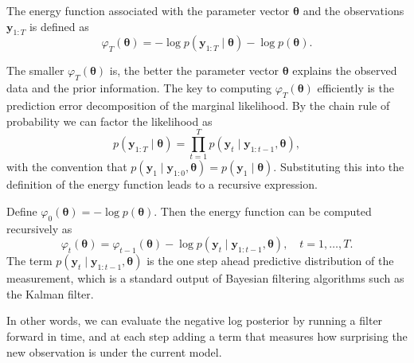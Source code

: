 \begin{definition}
    The energy function associated with the parameter vector $\boldsymbol{\theta}$ and the observations $\mathbf{y}_{1:T}$ is defined as 
    \begin{equation}
        \varphi_T(\boldsymbol{\theta}) = -\log p(\mathbf{y}_{1:T} \mid \boldsymbol{\theta})-\log p(\boldsymbol{\theta}).
    \end{equation}
\end{definition}

The smaller $\varphi_T(\boldsymbol{\theta})$ is, the better the parameter vector $\boldsymbol{\theta}$ explains the observed data and the prior information. 
The key to computing $\varphi_T(\boldsymbol{\theta})$ efficiently is the prediction error decomposition of the marginal likelihood. By the chain rule of probability we can factor the likelihood as 
\begin{equation}
    p(\mathbf{y}_{1:T} \mid \boldsymbol{\theta}) = \prod_{t=1}^Tp(\mathbf{y}_t \mid \mathbf{y}_{1:t-1}, \boldsymbol{\theta}),
\end{equation}
with the convention that $p(\mathbf{y}_1\mid \mathbf{y}_{1:0}, \boldsymbol{\theta}) = p(\mathbf{y}_1  \mid \boldsymbol{\theta})$.
Substituting this into the definition of the energy function leads to a recursive expression. 

\begin{theorem}
    Define $\varphi_0(\boldsymbol{\theta}) = -\log p(\boldsymbol{\theta})$. Then the energy function can be computed recursively as 
    \begin{equation}
    \varphi_t(\boldsymbol{\theta}) = \varphi_{t-1}(\boldsymbol{\theta})-\log p(\mathbf{y}_{t} \mid \mathbf{y}_{1:t-1},\boldsymbol{\theta}), \quad t= 1, \dots , T.        
    \end{equation}
    The term $p(\mathbf{y}_{t} \mid \mathbf{y}_{1:t-1},\boldsymbol{\theta})$ is the one step ahead predictive distribution of the measurement, which is a standard output of Bayesian filtering algorithms such as the Kalman filter. 
\end{theorem}
In other words, we can evaluate the negative log posterior by running a filter forward in time, and at each step adding a term that measures how surprising the new observation is under the current model. 

